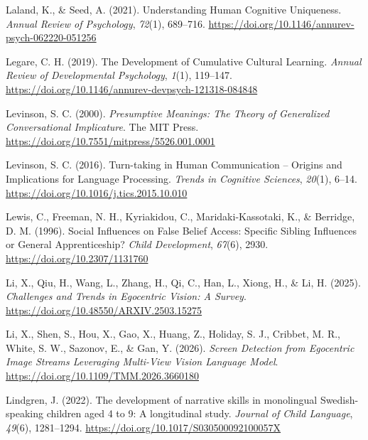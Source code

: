\documentclass[
  english,
  12pt,
  man,floatsintext]{apa6}
\newlength{\cslhangindent}
\newenvironment{CSLReferences}[2] %
 {\begin{list}{}{%
  \setlength{\itemindent}{0pt}
  \setlength{\leftmargin}{0pt}
  \setlength{\parsep}{0pt}
  \ifodd #1
   \setlength{\leftmargin}{\cslhangindent}
   \setlength{\itemindent}{-1\cslhangindent}
  \fi
  \setlength{\itemsep}{#2\baselineskip}}}
 {\end{list}}
\begin{document}
\begin{CSLReferences}{1}{0}
Laland, K., \& Seed, A. (2021). Understanding {Human Cognitive Uniqueness}. \emph{Annual Review of Psychology}, \emph{72}(1), 689--716. \url{https://doi.org/10.1146/annurev-psych-062220-051256}

Legare, C. H. (2019). The {Development} of {Cumulative Cultural Learning}. \emph{Annual Review of Developmental Psychology}, \emph{1}(1), 119--147. \url{https://doi.org/10.1146/annurev-devpsych-121318-084848}

Levinson, S. C. (2000). \emph{Presumptive {Meanings}: {The Theory} of {Generalized Conversational Implicature}}. The MIT Press. \url{https://doi.org/10.7551/mitpress/5526.001.0001}

Levinson, S. C. (2016). Turn-taking in {Human Communication} -- {Origins} and {Implications} for {Language Processing}. \emph{Trends in Cognitive Sciences}, \emph{20}(1), 6--14. \url{https://doi.org/10.1016/j.tics.2015.10.010}

Lewis, C., Freeman, N. H., Kyriakidou, C., Maridaki-Kassotaki, K., \& Berridge, D. M. (1996). Social {Influences} on {False Belief Access}: {Specific Sibling Influences} or {General Apprenticeship}? \emph{Child Development}, \emph{67}(6), 2930. \url{https://doi.org/10.2307/1131760}

Li, X., Qiu, H., Wang, L., Zhang, H., Qi, C., Han, L., Xiong, H., \& Li, H. (2025). \emph{Challenges and {Trends} in {Egocentric Vision}: {A Survey}}. \url{https://doi.org/10.48550/ARXIV.2503.15275}

Li, X., Shen, S., Hou, X., Gao, X., Huang, Z., Holiday, S. J., Cribbet, M. R., White, S. W., Sazonov, E., \& Gan, Y. (2026). \emph{Screen {Detection} from {Egocentric Image Streams Leveraging Multi-View Vision Language Model}}. \url{https://doi.org/10.1109/TMM.2026.3660180}

Lindgren, J. (2022). The development of narrative skills in monolingual {Swedish}-speaking children aged 4 to 9: A longitudinal study. \emph{Journal of Child Language}, \emph{49}(6), 1281--1294. \url{https://doi.org/10.1017/S030500092100057X}


\end{CSLReferences}
\end{document}
